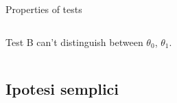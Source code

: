 \documentclass[asd-beamer.tex]{subfiles}%
\begin{document}
\begin{frame}{Properties of tests}
\begin{columns}[T]
\begin{column}{0.5\textwidth}
Test B can't distinguish between $\theta_0$, $\theta_1$.
	\end{column}
\end{columns}
\end{frame}

\subsection{Ipotesi semplici}
\end{document}
